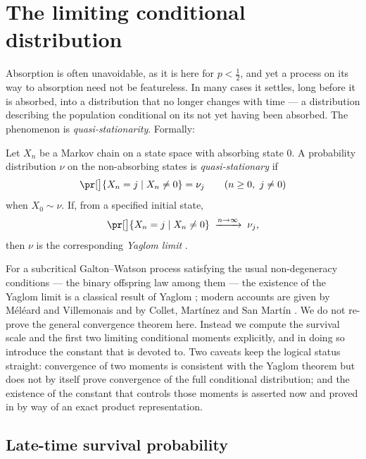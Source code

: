 \section{The limiting conditional distribution}
\label{m:sec:qsd}

Absorption is often unavoidable, as it is here for $p<\tfrac12$, and yet a process
on its way to absorption need not be featureless. In many cases it settles, long
before it is absorbed, into a distribution that no longer changes with time --- a
distribution describing the population conditional on its not yet having been
absorbed. The phenomenon is \emph{quasi-stationarity}. Formally:

\begin{definition}
\label{m:def:qsd}
Let $X_n$ be a Markov chain on a state space with absorbing state $0$. A
probability distribution $\nu$ on the non-absorbing states is
\emph{quasi-stationary} if
\begin{equation*}
\pr[\big]{X_n = j \mid X_n \neq 0} = \nu_j
\qquad (n\ge0,\ j\neq0)
\end{equation*}
when $X_0\sim\nu$. If, from a specified initial state,
\begin{equation*}
\pr[\big]{X_n = j \mid X_n\neq0} \;\xrightarrow{n\to\infty}\; \nu_j ,
\end{equation*}
then $\nu$ is the corresponding \emph{Yaglom limit} \cite{Yaglom1947}.
\end{definition}

For a subcritical Galton--Watson process satisfying the usual non-degeneracy
conditions --- the binary offspring law among them --- the existence of the Yaglom
limit is a classical result of Yaglom \cite{Yaglom1947}; modern accounts are given
by Méléard and Villemonais \cite{Meleard2012} and by Collet, Martínez and San
Martín \cite{Collet2013}. We do not re-prove the general convergence theorem here.
Instead we compute the survival scale and the first two limiting conditional
moments explicitly, and in doing so introduce the constant that \ChA{} is devoted
to. Two caveats keep the logical status straight: convergence of two moments is
consistent with the Yaglom theorem but does not by itself prove convergence of the
full conditional distribution; and the existence of the constant that controls
those moments is asserted now and proved in \ChA{} by way of an exact product
representation.

\subsection{Late-time survival probability}
\label{m:sec:lateS}

